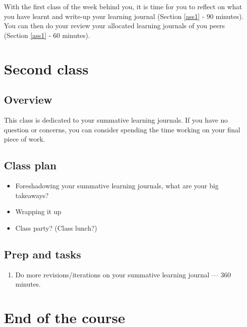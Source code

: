 \documentclass[]{book}
\providecommand{\tightlist}{%
  \setlength{\itemsep}{0pt}\setlength{\parskip}{0pt}}
\theoremstyle{definition}
\theoremstyle{definition}
\theoremstyle{definition}
\theoremstyle{remark}
\begin{document}
With the first class of the week behind you, it is time for you to
reflect on what you have learnt and write-up your learning journal
(Section \ref{ass1} ‐ 90 minutes). You can then do your review your
allocated learning journals of you peers (Section \ref{ass1} ‐ 60
minutes).

\hypertarget{second-class-5}{%
\section*{Second class}\label{second-class-5}}

\hypertarget{overview-11}{%
\subsection*{Overview}\label{overview-11}}

This class is dedicated to your summative learning journals. If you have
no question or concerns, you can consider spending the time working on
your final piece of work.

\hypertarget{class-plan-11}{%
\subsection*{Class plan}\label{class-plan-11}}

\begin{itemize}
\item
  Foreshadowing your summative learning journals, what are your big
  takeaways?
\item
  Wrapping it up
\item
  Class party? (Class lunch?)
\end{itemize}

\hypertarget{prep-and-tasks-11}{%
\subsection*{Prep and tasks}\label{prep-and-tasks-11}}

\begin{enumerate}
\def\labelenumi{\arabic{enumi}.}
\tightlist
\item
  Do more revisions/iterations on your summative learning journal ---
  360 minutes.
\end{enumerate}

\hypertarget{end-of-the-course}{%
\section*{End of the course}\label{end-of-the-course}}
\end{document}
